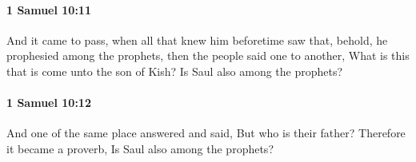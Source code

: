 		\paragraph{1 Samuel 10:11} %
			\label{1SAMUEL-10-11}

			And it came to pass, when all that knew him beforetime saw that, behold, he prophesied among the prophets, then the people said one to another, What is this that is come unto the son of Kish? Is Saul also among the prophets?


		\paragraph{1 Samuel 10:12} %
			\label{1SAMUEL-10-12}

			And one of the same place answered and said, But who is their father? Therefore it became a proverb, Is Saul also among the prophets?


